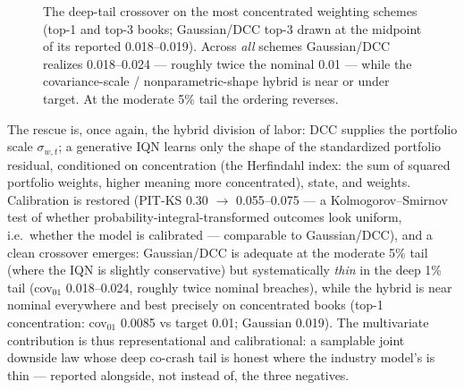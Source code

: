 \documentclass[11pt]{article}
\theoremstyle{remark}
\begin{document}
\begin{figure}[t]
\centering
{}
\caption{The deep-tail crossover on the most concentrated weighting
schemes (top-1 and top-3 books; Gaussian/DCC top-3 drawn at the midpoint
of its reported 0.018--0.019). Across \emph{all} schemes Gaussian/DCC
realizes 0.018--0.024 --- roughly twice the nominal 0.01 --- while the
covariance-scale / nonparametric-shape hybrid is near or under target.
At the moderate 5\% tail the ordering reverses.}
\label{fig:cocrash}
\end{figure}

The rescue is, once again, the hybrid division of labor: DCC supplies
the portfolio scale $\sigma_{w,t}$; a generative IQN learns only the
shape of the standardized portfolio residual, conditioned on
concentration (the Herfindahl index: the sum of squared portfolio
weights, higher meaning more concentrated), state, and weights.
Calibration is restored
(PIT-KS 0.30 $\to$ 0.055--0.075 --- a Kolmogorov--Smirnov test of
whether probability-integral-transformed outcomes look uniform, i.e.\
whether the model is calibrated --- comparable to Gaussian/DCC), and a
clean crossover emerges: Gaussian/DCC is adequate at the moderate 5\%
tail (where the IQN is slightly conservative) but systematically
\emph{thin} in the deep 1\% tail (cov$_{01}$ 0.018--0.024, roughly twice
nominal breaches), while the hybrid is near nominal everywhere and best
precisely on concentrated books (top-1 concentration: cov$_{01}$ 0.0085
vs target 0.01; Gaussian 0.019). The multivariate contribution is thus
representational and calibrational: a samplable joint downside law whose
deep co-crash tail is honest where the industry model's is thin ---
reported alongside, not instead of, the three negatives.
\end{document}

